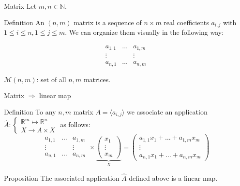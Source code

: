 \documentclass{beamer}
\begin{document}
\begin{frame}
  {Matrix}
  Let $m, n \in \mathbb{N}$.
  \begin{block}{Definition}
    An $(n,m)$ matrix is a sequence of $n \times m$ real coefficients $a_{i,j}$ with $1 \le i \le n, 1 \le j \le m$. We can organize them visually in the following way:

    \[\begin{array}{|ccc|} a_{1,1} & \dots & a_{1,m}\\ \vdots & & \vdots\\ a_{n,1} & \dots & a_{n, m} \end{array}\]

    $\mathcal{M}(n,m)$: set of all $n,m$ matrices.
  \end{block}
\end{frame}


\begin{frame}{Matrix $\Rightarrow$ linear map}
  \begin{block}{Definition}
    To any $n,m$ matrix $A = \langle a_{i,j} \rangle$ we associate an application $\hat A : \left \{ \begin{array}{l} \mathbb{R}^m \mapsto \mathbb{R}^n \\ X \rightarrow A \times X \end{array} \right .$ as follows:
    \[
    \begin{array}{|ccc|} a_{1,1} & \dots & a_{1,m}\\ \vdots & & \vdots\\ a_{n,1} & \dots & a_{n, m} \end{array} \times \underbrace{\left ( \begin{array}{c} x_1 \\ \vdots \\ x_m \end{array} \right )}_{X} = \left ( \begin{array}{c} a_{1,1}x_1 + \dots + a_{1,m}x_m \\ \vdots \\ a_{n,1}x_1 + \dots + a_{n,m} x_m \end{array} \right )  
    \]  
  \end{block}

  \begin{block}{Proposition}
    The associated application $\hat A$ defined above is a linear map.
  \end{block}
\end{frame}
\end{document}
